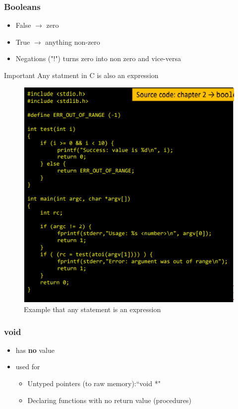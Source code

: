 \documentclass[a4paper,10pt]{article}
\begin{document}
\subsubsection{Booleans}
\begin{itemize}
    \item False $\rightarrow$ zero
    \item True $\rightarrow$ anything non-zero
    \item Negations ("!") turns zero into non zero and vice-versa
\end{itemize}
\pagebreak
\begin{tipbox}
    {Important}
    Any statment in C is also an expression
\end{tipbox}
\begin{figure}[h]
    \centering
    \includegraphics[width=0.7\linewidth]{e12.png}
    \caption{Example that any statement is an expression}
    \label{fig:enter-label}
\end{figure}
\subsubsection{void}
\begin{itemize}
    \item has \textbf{no} value
    \item used for
    \begin{itemize}
        \item Untyped pointers (to raw memory):“void *"
        \item Declaring functions with no return value (procedures)
    \end{itemize}
\end{itemize}
\pagebreak
\end{document}

